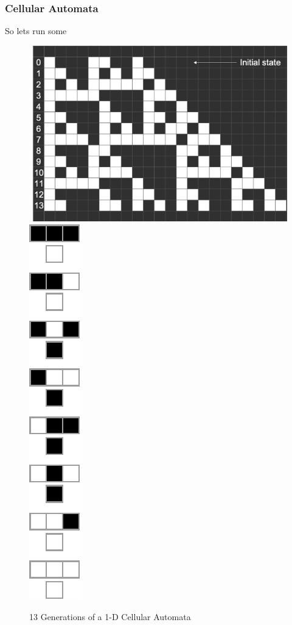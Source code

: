 \documentclass{beamer}
\begin{document}
\begin{frame}
    \frametitle{Cellular Automata}
    So lets run some 
    \begin{figure}
        \includegraphics[scale=0.3]{fig3.png}
        \includegraphics[scale=0.6]{rule60.pdf}
        \caption{13 Generations of a 1-D Cellular Automata}
    \end{figure}
\end{frame}
\end{document}
